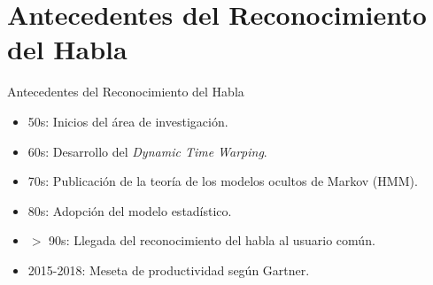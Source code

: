 \section{Antecedentes del Reconocimiento del Habla}

\begin{frame}{Antecedentes del Reconocimiento del Habla}
    \begin{itemize}
        \item 50s: Inicios del área de investigación.
        \item 60s: Desarrollo del \emph{Dynamic Time Warping}.
        \item 70s: Publicación de la teoría de los modelos ocultos de Markov (HMM).
        \item 80s: Adopción del modelo estadístico. %
        \item $>$ 90s: Llegada del reconocimiento del habla al usuario común.
        \item 2015-2018: Meseta de productividad según Gartner.
    \end{itemize}

\end{frame}